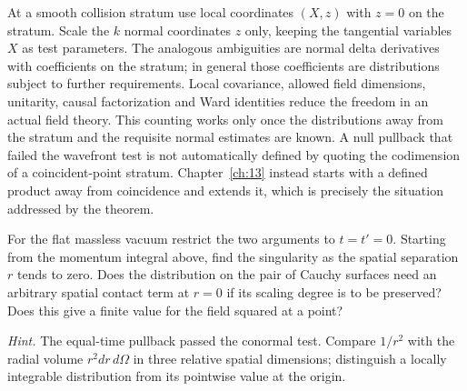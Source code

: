 At a smooth collision stratum use local coordinates $(X,z)$ with $z=0$
on the stratum. Scale the $k$ normal coordinates $z$ only, keeping the
tangential variables $X$ as test parameters. The analogous ambiguities
are normal delta derivatives with coefficients on the stratum; in general
those coefficients are distributions subject to further requirements.
Local covariance, allowed field dimensions, unitarity, causal
factorization and Ward identities reduce the freedom in an actual field
theory. This counting works only once the distributions away from the
stratum and the requisite normal estimates are known. A null pullback that
failed the wavefront test is not automatically defined by quoting the
codimension of a coincident-point stratum. Chapter~\ref{ch:13} instead
starts with a defined product away from coincidence and extends it, which
is precisely the situation addressed by the theorem.

\begin{exercise}
For the flat massless vacuum restrict the two arguments to $t=t'=0$.
Starting from the momentum integral above, find the singularity as the
spatial separation $r$ tends to zero. Does the distribution on the pair of
Cauchy surfaces need an arbitrary spatial contact term at $r=0$ if its
scaling degree is to be preserved? Does this give a finite value for the
field squared at a point?
\end{exercise}
\noindent\emph{Hint.} The equal-time pullback passed the conormal test.
Compare $1/r^2$ with the radial volume $r^2 dr\,d\Omega$ in three relative
spatial dimensions; distinguish a locally integrable distribution from its
pointwise value at the origin.
